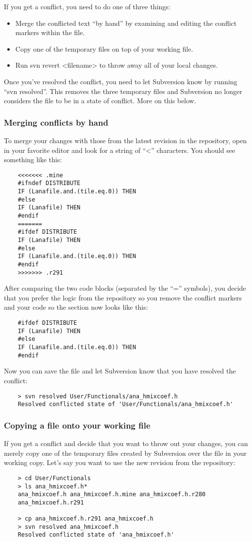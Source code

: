 If you get a conflict, you need to do one of three things:
\begin{itemize}
        \item Merge the conflicted text ``by hand'' by examining and
     editing the conflict markers within the file.
        \item Copy one of the temporary files on top of your working file.
        \item Run svn revert <filename> to throw away all of your local
     changes.
\end{itemize}
Once you've resolved the conflict, you need to let Subversion know by
running ``svn resolved''. This removes the three temporary files and
Subversion no longer considers the file to be in a state of conflict. More
on this below.

\subsubsection{Merging conflicts by hand}
To merge your changes with those from the latest revision in the repository,
open  in your favorite editor and
look for a string of ``<'' characters. You should see something like this:
\begin{verbatim}
    <<<<<<< .mine
    #ifndef DISTRIBUTE
    IF (Lanafile.and.(tile.eq.0)) THEN
    #else
    IF (Lanafile) THEN
    #endif
    =======
    #ifdef DISTRIBUTE
    IF (Lanafile) THEN
    #else
    IF (Lanafile.and.(tile.eq.0)) THEN
    #endif
    >>>>>>> .r291
\end{verbatim}
After comparing the two code blocks (separated by the ``='' symbols), you
decide that you prefer the logic from the repository so you remove the
conflict markers and your code so the section now looks like this:
\begin{verbatim}
    #ifdef DISTRIBUTE
    IF (Lanafile) THEN
    #else
    IF (Lanafile.and.(tile.eq.0)) THEN
    #endif
\end{verbatim}

Now you can save the file and let Subversion know that you have resolved the
conflict:
\begin{verbatim}
    > svn resolved User/Functionals/ana_hmixcoef.h
    Resolved conflicted state of 'User/Functionals/ana_hmixcoef.h'
\end{verbatim}

\subsubsection{Copying a file onto your working file}
If you get a conflict and decide that you want to throw out your changes,
you can merely copy one of the temporary files created by Subversion over
the file in your working copy. Let's say you want to use the new revision
from the repository:
\begin{verbatim}
    > cd User/Functionals
    > ls ana_hmixcoef.h*
    ana_hmixcoef.h ana_hmixcoef.h.mine ana_hmixcoef.h.r280
    ana_hmixcoef.h.r291

    > cp ana_hmixcoef.h.r291 ana_hmixcoef.h
    > svn resolved ana_hmixcoef.h
    Resolved conflicted state of 'ana_hmixcoef.h'
\end{verbatim}

